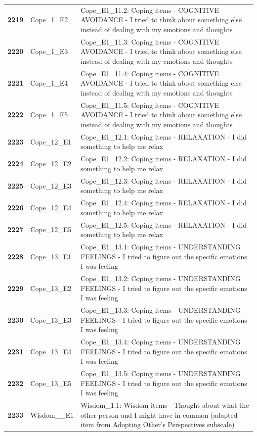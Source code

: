 \documentclass[
  letterpaper,
  DIV=11,
  numbers=noendperiod]{scrartcl}
\begin{document}
\begin{longtable}[t]{>{}cll}
\textbf{2219} & Cope\_1\_E2 & Cope\_E1\_11.2: Coping items - COGNITIVE AVOIDANCE - I tried to think about something else instead of dealing with my emotions and thoughts\\
\textbf{2220} & Cope\_1\_E3 & Cope\_E1\_11.3: Coping items - COGNITIVE AVOIDANCE - I tried to think about something else instead of dealing with my emotions and thoughts\\
\addlinespace
\textbf{2221} & Cope\_1\_E4 & Cope\_E1\_11.4: Coping items - COGNITIVE AVOIDANCE - I tried to think about something else instead of dealing with my emotions and thoughts\\
\textbf{2222} & Cope\_1\_E5 & Cope\_E1\_11.5: Coping items - COGNITIVE AVOIDANCE - I tried to think about something else instead of dealing with my emotions and thoughts\\
\textbf{2223} & Cope\_12\_E1 & Cope\_E1\_12.1: Coping items - RELAXATION - I did something to help me relax\\
\textbf{2224} & Cope\_12\_E2 & Cope\_E1\_12.2: Coping items - RELAXATION - I did something to help me relax\\
\textbf{2225} & Cope\_12\_E3 & Cope\_E1\_12.3: Coping items - RELAXATION - I did something to help me relax\\
\addlinespace
\textbf{2226} & Cope\_12\_E4 & Cope\_E1\_12.4: Coping items - RELAXATION - I did something to help me relax\\
\textbf{2227} & Cope\_12\_E5 & Cope\_E1\_12.5: Coping items - RELAXATION - I did something to help me relax\\
\textbf{2228} & Cope\_13\_E1 & Cope\_E1\_13.1: Coping items - UNDERSTANDING FEELINGS - I tried to figure out the specific emotions I was feeling\\
\textbf{2229} & Cope\_13\_E2 & Cope\_E1\_13.2: Coping items - UNDERSTANDING FEELINGS - I tried to figure out the specific emotions I was feeling\\
\textbf{2230} & Cope\_13\_E3 & Cope\_E1\_13.3: Coping items - UNDERSTANDING FEELINGS - I tried to figure out the specific emotions I was feeling\\
\addlinespace
\textbf{2231} & Cope\_13\_E4 & Cope\_E1\_13.4: Coping items - UNDERSTANDING FEELINGS - I tried to figure out the specific emotions I was feeling\\
\textbf{2232} & Cope\_13\_E5 & Cope\_E1\_13.5: Coping items - UNDERSTANDING FEELINGS - I tried to figure out the specific emotions I was feeling\\
\textbf{2233} & Wisdom\_\_E1 & Wisdom\_1.1: Wisdom items - Thought about what the other person and I might have in common (adapted item from Adopting Other's Perspectives subscale)\\

\end{longtable}
\end{document}

